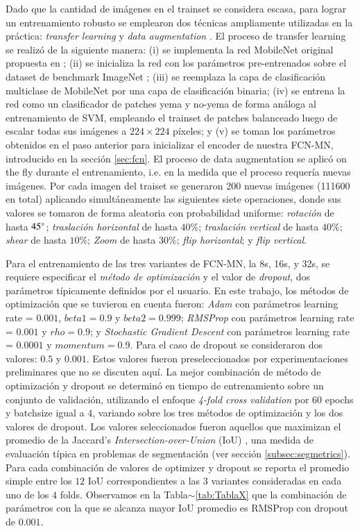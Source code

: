 \documentclass[a4paper,authoryear,review]{elsarticle}
\begin{document}
Dado que la cantidad de imágenes en el trainset se considera escasa, para lograr un entrenamiento robusto se emplearon dos técnicas ampliamente utilizadas en la práctica: \emph{transfer learning} \cite{pan2009survey} y \emph{data augmentation} \cite{shorten2019survey}. El proceso de transfer learning se realizó de la siguiente manera: (i) se implementa la red MobileNet original propuesta en \citet{howard2017mobilenets}; (ii) se inicializa la red con los parámetros pre-entrenados sobre el dataset de benchmark ImageNet \cite{kornblith2019better}; (iii) se reemplaza la capa de clasificación multiclase de MobileNet por una capa de clasificación binaria; (iv) se entrena la red como un clasificador de patches yema y no-yema de forma análoga al entrenamiento de SVM, empleando el trainset de patches balanceado luego de escalar todas sus imágenes a $224 \times 224$ píxeles; y (v) se toman los parámetros obtenidos en el paso anterior para inicializar el encoder de nuestra FCN-MN, introducido en la sección \ref{sec:fcn}. El proceso de data augmentation se aplicó on the fly durante el entrenamiento, i.e. en la medida que el proceso requería nuevas imágenes. Por cada imagen del traiset se generaron 200 nuevas imágenes (111600 en total) aplicando simultáneamente las siguientes siete operaciones, donde sus valores se tomaron de forma aleatoria con probabilidad uniforme: \emph{rotación} de hasta $45\degree$; \emph{traslación horizontal} de hasta $40\%$; \emph{traslación vertical} de hasta $40\%$; \emph{shear} de hasta $10\%$; \emph{Zoom} de hasta $30\%$; \emph{flip horizontal}; y \emph{flip vertical}. 

%
Para el entrenamiento de las tres variantes de FCN-MN, la 8s, 16s, y 32s, se requiere especificar el \emph{método de optimización} y el valor de \emph{dropout}, dos parámetros típicamente definidos por el usuario. En este trabajo, los métodos de optimización que se tuvieron en cuenta fueron: \emph{Adam} con parámetros learning rate = $0.001$, $beta1 = 0.9$ y $beta2 = 0.999$; \emph{RMSProp} con parámetros learning rate = $0.001$ y $rho = 0.9$; y \emph{Stochastic Gradient Descent} con parámetros learning rate = $0.0001$ y $momentum = 0.9$. Para el caso de dropout se consideraron dos valores: $0.5$ y $0.001$. Estos valores fueron preseleccionados por experimentaciones preliminares que no se discuten aquí.
%
La mejor combinación de método de optimización y dropout se determinó en tiempo de entrenamiento sobre un conjunto de validación, utilizando el enfoque \emph{4-fold cross validation} por 60 epochs y batchsize igual a $4$, variando sobre los tres métodos de optimización y los dos valores de dropout. Los valores seleccionados fueron aquellos que maximizan el promedio de la Jaccard’s \emph{Intersection-over-Union} (IoU) \citep{jaccard1912distribution}, una medida de evaluación típica en problemas de segmentación (ver sección \ref{subsec:segmetrics}). Para cada combinación de valores de optimizer y dropout se reporta el promedio simple entre los $12$ IoU correspondientes a las $3$ variantes consideradas en cada uno de los $4$ folds. Observamos en la Tabla$\sim$\ref{tab:TablaX} que la combinación de parámetros con la que se alcanza mayor IoU promedio es RMSProp con dropout de $0.001$. 
\end{document}

